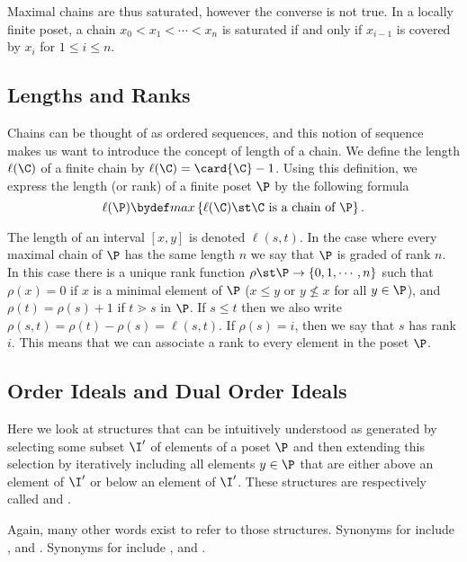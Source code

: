 Maximal chains are thus saturated, however the converse is not true. In a
locally finite poset, a chain $x_0 < x_1 < \cdots < x_n$ is saturated if and
only if $x_{i-1}$ is covered by $x_i$ for $1 \le i \le n$.


\subsection{Lengths and Ranks}

Chains can be thought of as ordered sequences, and this notion of sequence makes
us want to introduce the concept of length of a chain. We define the length
$\ell(\C)$ of a finite chain by $\ell(\C) = \card{\C} - 1$. Using this definition, we
express the length (or rank) of a finite poset $\P$ by the following formula
\begin{displaymath}
\ell(\P) \bydef max\left\{{\ell(\C) \st \C ~\text{is a chain of}~ \P}\right\}.
\end{displaymath}

The length of an interval $[x, y]$ is denoted $\ell(s, t)$. In the case where
every maximal chain of $\P$ has the same length $n$ we say that $\P$ is graded of
rank $n$. In this case there is a unique rank function $\rho \st \P \to \left\{{0,
1, \cdots , n}\right\}$ such that $\rho(x) = 0$ if $x$ is a minimal element of
$\P$ ($x \le y$ or $y \nleq x$ for all $y \in \P$), and $\rho(t) = \rho(s) + 1$
if $t \gtrdot s$ in $\P$. If $s \le t$ then we also write $\rho(s, t) = \rho(t)
- \rho(s) = \ell(s, t)$. If $\rho(s) = i$, then we say that $s$ has rank $i$.
This means that we can associate a rank to every element in the poset $\P$.


\subsection{Order Ideals and Dual Order Ideals}

Here we look at structures that can be intuitively understood as generated by
selecting some subset $\I'$ of elements of a poset $\P$ and then extending this
selection by iteratively including all elements $y \in \P$ that
are either above an element of $\I'$ or below an element of $\I'$. These
structures are respectively called  and .

Again, many other words exist to refer to those structures. Synonyms for
 include ,  and
. Synonyms for  include
,  and .

